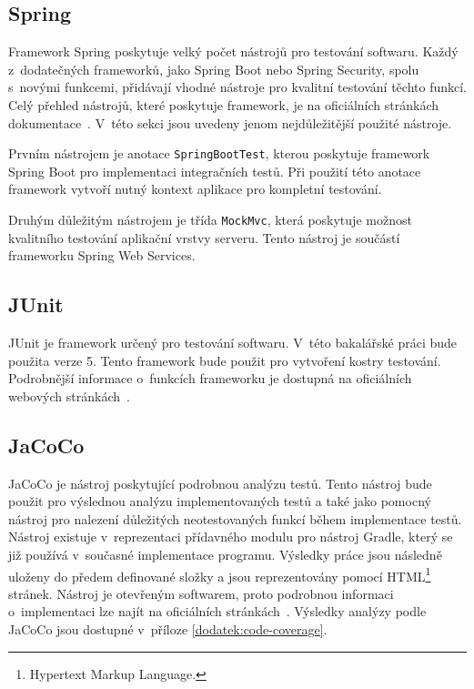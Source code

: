     \subsection{Spring}
        Framework Spring poskytuje velký počet nástrojů pro testování softwaru. Každý z~dodatečných frameworků, jako Spring Boot nebo Spring Security, spolu s~novými funkcemi, přidávají vhodné nástroje pro kvalitní testování těchto funkcí. Celý přehled nástrojů, které poskytuje framework, je na oficiálních stránkách dokumentace~\cite{spring-tests-doc}. V~této sekci jsou uvedeny jenom nejdůležitější použité nástroje.
        
        Prvním nástrojem je anotace \texttt{SpringBootTest}, kterou poskytuje framework Spring Boot pro implementaci integračních testů. Při použití této anotace framework vytvoří nutný kontext aplikace pro kompletní testování.
        
        Druhým důležitým nástrojem je třída \texttt{MockMvc}, která poskytuje možnost kvalitního testování aplikační vrstvy serveru. Tento nástroj je součástí frameworku Spring Web Services.
        
    \subsection{JUnit}
        JUnit je framework určený pro testování softwaru. V~této bakalářské práci bude použita verze 5. Tento framework bude použit pro vytvoření kostry testování. Podrobnější informace o~funkcích frameworku je dostupná na oficiálních webových stránkách~\cite{junit-doc}.
        
    \subsection{JaCoCo}\label{resere:testovani:jacoco}
        JaCoCo je nástroj poskytující podrobnou analýzu testů. Tento nástroj bude použit pro výslednou analýzu implementovaných testů a také jako pomocný nástroj pro nalezení důležitých neotestovaných funkcí během implementace testů. Nástroj existuje v~reprezentaci přídavného modulu pro nástroj Gradle, který se již používá v~současné implementace programu. Výsledky práce jsou následně uloženy do předem definované složky a jsou reprezentovány pomocí HTML\footnote{Hypertext Markup Language.} stránek. Nástroj je otevřeným softwarem, proto podrobnou informaci o~implementaci lze najít na oficiálních stránkách~\cite{jacoco-implementation}. Výsledky analýzy podle JaCoCo jsou dostupné v~příloze \ref{dodatek:code-coverage}.
        
